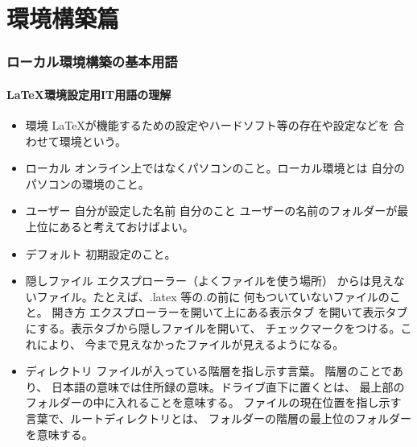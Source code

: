 \documentclass{ltjsarticle}
\begin{document}
\part{環境構築篇}
\section{ローカル環境構築の基本用語}
\subsection{\LaTeX 環境設定用IT用語の理解}

\begin{itemize}
  \item 環境 \LaTeX が機能するための設定やハードソフト等の存在や設定などを
        合わせて環境という。
  \item ローカル  オンライン上ではなくパソコンのこと。ローカル環境とは
        自分のパソコンの環境のこと。
  \item ユーザー 自分が設定した名前 自分のこと
        ユーザーの名前のフォルダーが最上位にあると考えておけばよい。
  \item デフォルト 初期設定のこと。
  \item 隠しファイル エクスプローラー（よくファイルを使う場所）
        からは見えないファイル。たとえば、.latex 等の.の前に
        何もついていないファイルのこと。
        開き方 エクスプローラーを開いて上にある表示タブ
        を開いて表示タブにする。表示タブから隠しファイルを開いて、
        チェックマークをつける。これにより、
        今まで見えなかったファイルが見えるようになる。

  \item ディレクトリ ファイルが入っている階層を指し示す言葉。
        階層のことであり、
        日本語の意味では住所録の意味。ドライブ直下に置くとは、
        最上部のフォルダーの中に入れることを意味する。
        ファイルの現在位置を指し示す言葉で、ルートディレクトリとは、
        フォルダーの階層の最上位のフォルダーを意味する。



\end{itemize}
\end{document}
